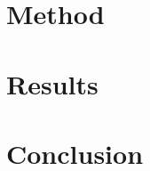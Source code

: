 \documentclass[sigconf]{acmart}  %
\begin{document}


\section{Method} \label{sec:method}



\section{Results} \label{sec:results}



\section{Conclusion} \label{sec:conclusion}




\end{document}
